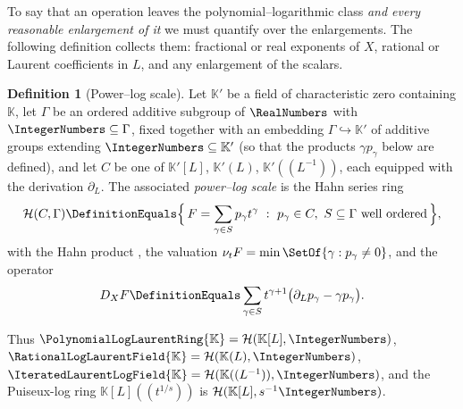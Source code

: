 \documentclass[11pt,oneside]{article}
\theoremstyle{plain}
\theoremstyle{definition}
\newtheorem{definition}[theorem]{Definition}
\theoremstyle{remark}
\newcommand{\K}{\mathbb{K}}
\newcommand{\PLlau}{\PolynomialLogLaurentRing{\K}}       %
\newcommand{\PLrat}{\RationalLogLaurentField{\K}}        %
\newcommand{\PLit}{\IteratedLaurentLogField{\K}}         %
\newcommand{\ordt}{\nu_{t}}                              %
\newcommand{\DX}{D_{X}}                                  %
\begin{document}
To say that an operation leaves the polynomial--logarithmic class \emph{and
every reasonable enlargement of it} we must quantify over the enlargements.
The following definition collects them: fractional or real exponents of \(X\),
rational or Laurent coefficients in \(L\), and any enlargement of the scalars.

\begin{definition}[Power--log scale]\label{plt:def:dif-scale}
Let \(\K'\) be a field of characteristic zero containing \(\K\), let
\(\Gamma\) be an ordered additive subgroup of \(\RealNumbers\) with
\(\IntegerNumbers\subseteq\Gamma\), fixed together with an embedding
\(\Gamma\hookrightarrow\K'\) of additive groups extending
\(\IntegerNumbers\subseteq\K'\) (so that the products \(\gamma p_{\gamma}\)
below are defined), and let \(C\) be one of
\(\K'[L]\), \(\K'(L)\), \(\K'((L^{-1}))\), each equipped with the derivation
\(\partial_{L}\).  The associated \emph{power--log scale} is the Hahn series
ring
\[
  \mathcal H(C,\Gamma)
  \DefinitionEquals
  \Bigl\{\,F=\sum_{\gamma\in S}p_{\gamma}t^{\gamma}\ :\
    p_{\gamma}\in C,\ S\subseteq\Gamma\ \text{well ordered}\,\Bigr\},
\]
with the Hahn product \cite{hahn}, the valuation
\(\ordt F=\min\SetOf{\gamma:p_{\gamma}\ne0}\), and the operator
\begin{equation}\label{plt:eq:dif-scale-derivation}
  \DX F\DefinitionEquals
  \sum_{\gamma\in S}t^{\gamma+1}\bigl(\partial_{L}p_{\gamma}
  -\gamma p_{\gamma}\bigr).
\end{equation}
\end{definition}

Thus \(\PLlau=\mathcal H(\K[L],\IntegerNumbers)\),
\(\PLrat=\mathcal H(\K(L),\IntegerNumbers)\),
\(\PLit=\mathcal H(\K((L^{-1})),\IntegerNumbers)\), and the Puiseux-log ring
\(\K[L]((t^{1/s}))\) is \(\mathcal H(\K[L],s^{-1}\IntegerNumbers)\).
\end{document}

